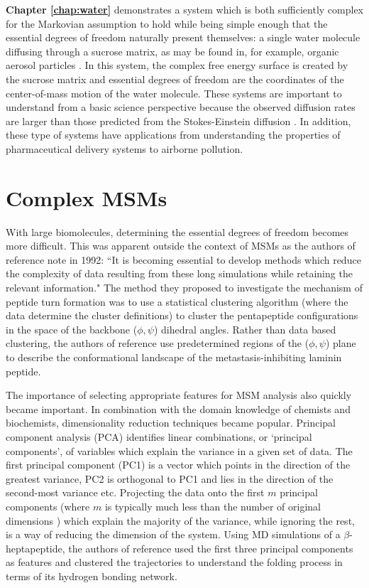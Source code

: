 \textbf{Chapter \ref{chap:water}} demonstrates a system which is both sufficiently complex for the Markovian assumption to hold while being simple enough that the essential degrees of freedom naturally present themselves: a single water molecule diffusing through a sucrose matrix, as may be found in, for example, organic aerosol particles \cite{songTransientCavityDynamics2020a}. In this system, the complex free energy surface is created by the sucrose matrix and essential degrees of freedom are the coordinates of the center-of-mass motion of the water molecule. These systems are important to understand from a basic science perspective because the observed diffusion rates are larger than those predicted from the Stokes-Einstein diffusion \cite{songTransientCavityDynamics2020a}. In addition, these type of systems have applications from understanding the properties of pharmaceutical delivery systems to airborne pollution. 

\section{Complex MSMs}
With large biomolecules, determining the essential degrees of freedom becomes more difficult. This was apparent outside the context of MSMs as the authors of  reference \cite{karpen1993statistical} note in 1992: 
``It is becoming essential to develop methods which reduce the complexity of data resulting from these long simulations while retaining the relevant information." The method they proposed to investigate the mechanism of peptide turn formation was to use a statistical clustering algorithm (where the data determine the cluster definitions) to cluster the pentapeptide configurations in the space of the backbone ($\phi, \psi$) dihedral angles. Rather than data based clustering, the authors of reference \cite{mckelveyCHARMMAnalysisConformations1991} use predetermined regions of the ($\phi, \psi$) plane to describe the conformational landscape of the metastasis-inhibiting laminin peptide.  

The importance of selecting appropriate features for MSM analysis also quickly became important. In combination with the domain knowledge of chemists and biochemists, dimensionality reduction \cite{friedman2001elements} techniques became popular.  Principal component analysis (PCA) \cite{leverPrincipalComponentAnalysis2017} identifies linear combinations, or `principal components', of variables which explain the variance in a given set of data. The first principal component (PC1) is a vector which points in the direction of the greatest variance, PC2 is orthogonal to PC1 and lies in the direction of the second-most variance etc. Projecting the data onto the first $m$ principal components (where $m$ is typically much less than the number of original dimensions \cite{leverPrincipalComponentAnalysis2017}) which explain the majority of the variance, while ignoring the rest, is a way of reducing the dimension of the system. Using MD simulations of a $\beta$-heptapeptide, the authors of reference \cite{degrootEssentialDynamicsReversible2001} used the first three principal components as features and clustered the trajectories to understand the folding process in terms of its hydrogen bonding network. 

